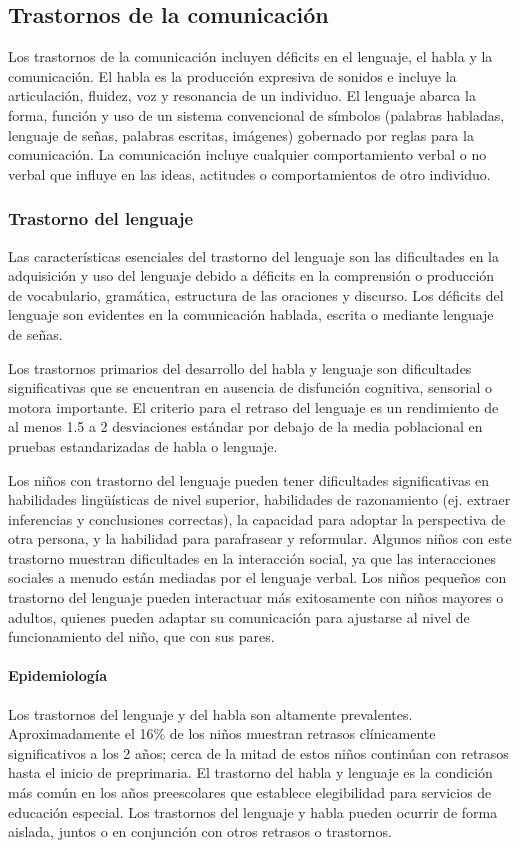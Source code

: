 \documentclass[11pt,letterpaper]{report}
\begin{document}
\subsection{Trastornos de la comunicación}
Los trastornos de la comunicación incluyen déficits en el lenguaje, el habla y
la comunicación. El habla es la producción expresiva de sonidos e incluye la
articulación, fluidez, voz y resonancia de un individuo. El lenguaje abarca la
forma, función y uso de un sistema convencional de símbolos (palabras habladas,
lenguaje de señas, palabras escritas, imágenes) gobernado por reglas para la
comunicación. La comunicación incluye cualquier comportamiento verbal o no
verbal que influye en las ideas, actitudes o comportamientos de otro individuo.
\cite{DSM5TR}

\subsubsection{Trastorno del lenguaje}
Las características esenciales del trastorno del lenguaje son las dificultades
en la adquisición y uso del lenguaje debido a déficits en la comprensión o
producción de vocabulario, gramática, estructura de las oraciones y discurso.
Los déficits del lenguaje son evidentes en la comunicación hablada, escrita o
mediante lenguaje de señas. \cite{DSM5TR}

Los trastornos primarios del desarrollo del habla y lenguaje son dificultades
significativas que se encuentran en ausencia de disfunción cognitiva, sensorial
o motora importante. El criterio para el retraso del lenguaje es un rendimiento
de al menos 1.5 a 2 desviaciones estándar por debajo de la media poblacional en
pruebas estandarizadas de habla o lenguaje. \cite{Feldman44}

Los niños con trastorno del lenguaje pueden tener dificultades significativas
en habilidades lingüísticas de nivel superior, habilidades de razonamiento
(ej. extraer inferencias y conclusiones correctas), la capacidad para adoptar
la perspectiva de otra persona, y la habilidad para parafrasear y reformular.
Algunos niños con este trastorno muestran dificultades en la interacción
social, ya que las interacciones sociales a menudo están mediadas por el
lenguaje verbal. Los niños pequeños con trastorno del lenguaje pueden
interactuar más exitosamente con niños mayores o adultos, quienes pueden
adaptar su comunicación para ajustarse al nivel de funcionamiento del niño, que
con sus pares. \cite{Nelson53}

\paragraph{Epidemiología}
Los trastornos del lenguaje y del habla son altamente prevalentes.
Aproximadamente el 16\% de los niños muestran retrasos clínicamente
significativos a los 2 años; cerca de la mitad de estos niños continúan
con retrasos hasta el inicio de preprimaria. El trastorno del habla y lenguaje
es la condición más común en los años preescolares que establece elegibilidad
para servicios de educación especial. Los trastornos del lenguaje y habla
pueden ocurrir de forma aislada, juntos o en conjunción con otros retrasos o
trastornos. \cite{Feldman44}
\end{document}
